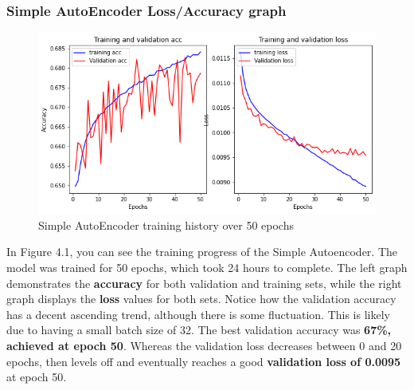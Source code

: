 \subsubsection*{Simple AutoEncoder Loss/Accuracy graph}
\begin{figure}[H]
    \centering
    \includegraphics[width=0.7\columnwidth]{sections/figures/autoencoder1_history_loss.png}
    \caption{Simple AutoEncoder training history over 50 epochs}
    \label{fig:my_label}
\end{figure}

In Figure 4.1, you can see the training progress of the Simple Autoencoder. The model was trained for 50 epochs, which took 24 hours to complete. The left graph demonstrates the \textbf{accuracy} for both validation and training sets, while the right graph displays the \textbf{loss} values for both sets. Notice how the validation accuracy has a decent ascending trend, although there is some fluctuation. This is likely due to having a small batch size of 32. The best validation accuracy was \textbf{67\%, achieved at epoch 50}. Whereas the validation loss decreases between 0 and 20 epochs, then levels off and eventually reaches a good \textbf{validation loss of 0.0095} at epoch 50.

